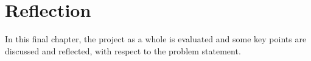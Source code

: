 \chapter{Reflection}
In this final chapter, the project as a whole is evaluated and some key points are discussed and reflected, with respect to the problem statement. 


